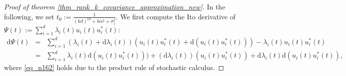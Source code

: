 \documentclass[11pt,letterpaper]{article}
\begin{document}
\begin{proof}[Proof of theorem \ref{thm_rank_k_covariance_approximation_new}]
%
%
In the following, we set $t_0 := \frac{1}{(kd)^{10} + k\alpha^2 +\sigma_1^2}$.
%
We first compute the Ito derivative of $\Psi(t) := \sum_{i=1}^d \lambda_i(t) u_i(t) u_i^\ast(t)$:
%
\begin{eqnarray}
    \mathrm{d} \Psi(t) &=& \sum_{i=1}^d(\lambda_i(t) + \mathrm{d}\lambda_i(t)) (u_i(t) u_i^\ast(t) + \mathrm{d}(u_i(t) u_i^\ast(t))) - \lambda_i(t) u_i(t) u_i^\ast(t) \label{eq_n162} \\
    &=&\sum_{i=1}^d \lambda_i(t) \mathrm{d}(u_i(t) u_i^\ast(t))) + (\mathrm{d}\lambda_i(t)) (u_i(t) u_i^\ast(t)) + \mathrm{d}\lambda_i(t) \mathrm{d}( u_i(t) u_i^\ast(t)), \label{eq_ito_derivative_b}
\end{eqnarray}
%
where \eqref{eq_n162} holds due to the product rule of stochastic calculus.


\end{proof}
\end{document}
